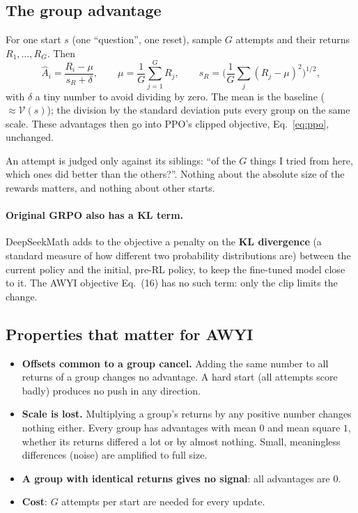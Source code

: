 \documentclass[11pt,a4paper]{article}
\newcommand{\Ah}{\hat A}
\newcommand{\Vf}{\mathcal{V}}
\begin{document}
\subsection{The group advantage}
For one start $s$ (one ``question'', one reset), sample $G$ attempts and their returns $R_1,\dots,R_G$. Then
\begin{equation}
\Ah_i=\frac{R_i-\mu}{s_R+\delta},\qquad\mu=\frac1G\sum_{j=1}^{G}R_j,\qquad s_R=\Big(\frac1G\sum_j(R_j-\mu)^2\Big)^{1/2},
\label{eq:grpo-adv}
\end{equation}
with $\delta$ a tiny number to avoid dividing by zero. The mean is the baseline ($\approx\Vf(s)$); the division by the standard deviation puts every group on the same scale. These advantages then go into PPO's clipped objective, Eq.~\eqref{eq:ppo}, unchanged.

\begin{intuition}
An attempt is judged only against its siblings: ``of the $G$ things I tried from here, which ones did better than the others?''. Nothing about the absolute size of the rewards matters, and nothing about other starts.
\end{intuition}

\paragraph{Original GRPO also has a KL term.} DeepSeekMath adds to the objective a penalty on the \textbf{KL divergence} (a standard measure of how different two probability distributions are) between the current policy and the initial, pre-RL policy, to keep the fine-tuned model close to it. The AWYI objective Eq.~(16) has no such term: only the clip limits the change.

\subsection{Properties that matter for AWYI}
\begin{itemize}
\item \textbf{Offsets common to a group cancel.} Adding the same number to all returns of a group changes no advantage. A hard start (all attempts score badly) produces no push in any direction.
\item \textbf{Scale is lost.} Multiplying a group's returns by any positive number changes nothing either. Every group has advantages with mean $0$ and mean square $1$, whether its returns differed a lot or by almost nothing. Small, meaningless differences (noise) are amplified to full size.
\item \textbf{A group with identical returns gives no signal}: all advantages are $0$.
\item \textbf{Cost}: $G$ attempts per start are needed for every update.
\end{itemize}
\end{document}

